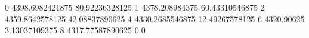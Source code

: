0 4398.6982421875 80.92236328125
1 4378.208984375 60.43310546875
2 4359.8642578125 42.08837890625
4 4330.2685546875 12.49267578125
6 4320.90625 3.13037109375
8 4317.77587890625 0.0
